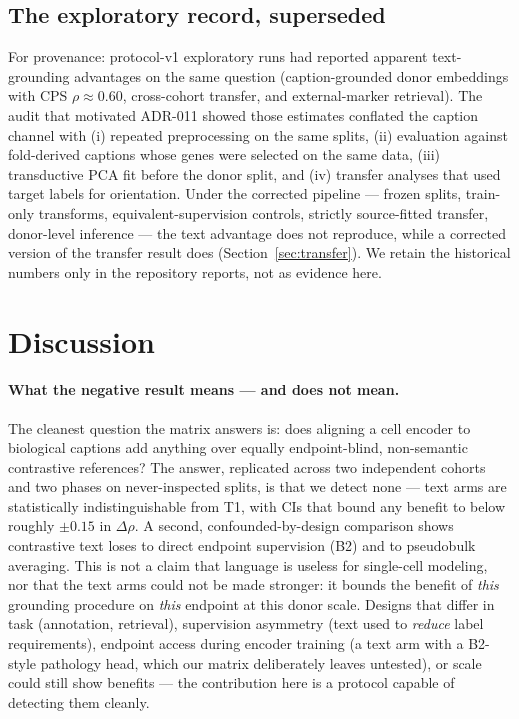 \documentclass[11pt]{article}
\begin{document}
\subsection{The exploratory record, superseded}
\label{sec:historical}

For provenance: protocol-v1 exploratory runs had reported apparent
text-grounding advantages on the same question (caption-grounded donor
embeddings with CPS $\rho\approx0.60$, cross-cohort transfer, and
external-marker retrieval). The audit that motivated ADR-011 showed
those estimates conflated the caption channel with (i) repeated
preprocessing on the same splits, (ii) evaluation against fold-derived
captions whose genes were selected on the same data, (iii) transductive
PCA fit before the donor split, and (iv) transfer analyses that used
target labels for orientation. Under the corrected pipeline --- frozen
splits, train-only transforms, equivalent-supervision controls,
strictly source-fitted transfer, donor-level inference --- the text
advantage does not reproduce, while a corrected version of the transfer
result does (Section~\ref{sec:transfer}). We retain the historical
numbers only in the repository reports, not as evidence here.

\section{Discussion}

\paragraph{What the negative result means --- and does not mean.}
The cleanest question the matrix answers is: does aligning a cell
encoder to biological captions add anything over equally
endpoint-blind, non-semantic contrastive references? The answer,
replicated across two independent cohorts and two phases on
never-inspected splits, is that we detect none --- text arms are
statistically indistinguishable from T1, with CIs that bound any
benefit to below roughly $\pm0.15$ in $\Delta\rho$. A second,
confounded-by-design comparison shows contrastive text loses to direct
endpoint supervision (B2) and to pseudobulk averaging. This is not a
claim that language is useless for single-cell modeling, nor that the
text arms could not be made stronger: it bounds the benefit of
\emph{this} grounding procedure on \emph{this} endpoint at this donor
scale. Designs that differ in task (annotation, retrieval), supervision
asymmetry (text used to \emph{reduce} label requirements), endpoint
access during encoder training (a text arm with a B2-style pathology
head, which our matrix deliberately leaves untested), or scale could
still show benefits --- the contribution here is a protocol capable of
detecting them cleanly.
\end{document}
